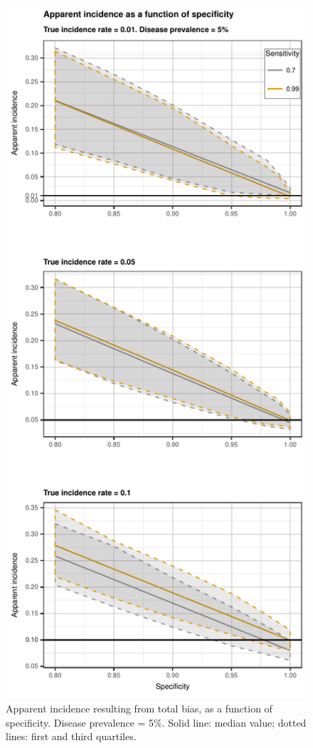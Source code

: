\documentclass[utf8]{frontiersSCNS}\usepackage[]{graphicx}\usepackage[]{color}
\begin{document}
\begin{figure}[htbp]
  \begin{center}
    \includegraphics[scale=.95]{master-dohoo5_incidence-1}
    \end{center}
  \caption{Apparent incidence resulting from total bias, as a function of
    specificity. Disease prevalence = 5\%. Solid line: median value; dotted
    lines: first and third quartiles.}
  \label{fig:apparent_incidence_5}
\end{figure}
\end{document}
